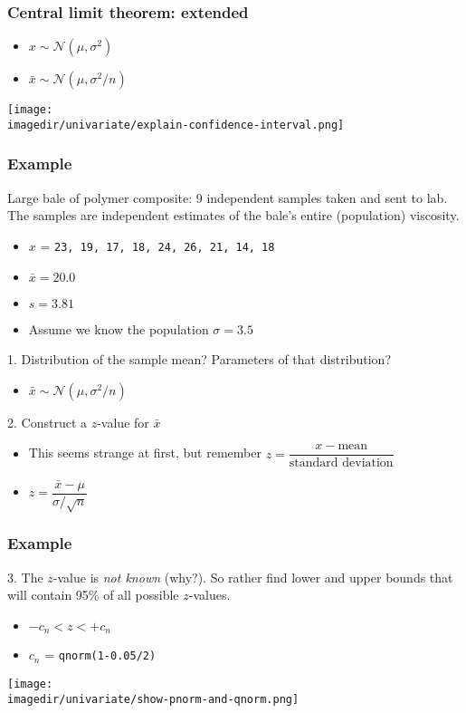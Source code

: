 \begin{frame}\frametitle{Central limit theorem: extended}
	\begin{itemize}
		\item $x \sim \mathcal{N}\left(\mu, \sigma^2 \right)$
		\item $\bar{x} \sim \mathcal{N}\left(\mu, \sigma^2/n \right)$
	\end{itemize}

	\texttt{[image: \\imagedir/univariate/explain-confidence-interval.png]}
\end{frame}

\begin{frame}\frametitle{Example}

	Large bale of polymer composite: 9 independent samples taken and sent to lab. The samples are independent estimates of the bale's entire (population) viscosity.
	\begin{itemize}
		\item $x$ = \texttt{23, 19, 17, 18, 24, 26, 21, 14, 18}
		\item $\bar{x} = 20.0$
		\item $s=3.81$
		\item Assume we know the population $\sigma=3.5$
	\end{itemize}

	1. Distribution of the sample mean? Parameters of that distribution? \pause
	\begin{itemize}
		\item$\bar{x} \sim \mathcal{N}\left(\mu, \sigma^2/n \right)$ \pause
	\end{itemize}
	2. Construct a $z$-value for $\bar{x} $
	\begin{itemize}
		\item This seems strange at first, but remember $z = \dfrac{x - \text{mean}}{\text{standard deviation}}$
		\item $z = \dfrac{\bar{x} -\mu}{\sigma/\sqrt{n}}$
	\end{itemize}
\end{frame}

\begin{frame}\frametitle{Example}

	3. The $z$-value is \emph{not known} (why?). So rather find lower and upper bounds that will contain 95\% of all possible $z$-values.
	\begin{itemize}
		\item$-c_n < z < +c_n$
		\item$c_n$ = \texttt{qnorm(1-0.05/2)}\pause
	\end{itemize}

	\texttt{[image: \\imagedir/univariate/show-pnorm-and-qnorm.png]}
\end{frame}

